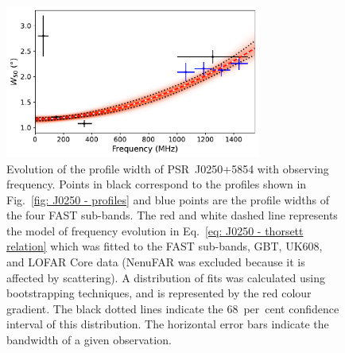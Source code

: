 \begin{figure}
    \begin{center}
        \includegraphics[width=0.75\textwidth]{Figures/J0250/thorsett_relation.pdf}
        \caption[Broadening of the profile with increasing frequency]{Evolution of the profile width of PSR~J0250+5854 with observing frequency. Points in black correspond to the profiles shown in Fig.~\ref{fig: J0250 - profiles} and blue points are the profile widths of the four FAST sub-bands. The red and white dashed line represents the model of frequency evolution in Eq.~\eqref{eq: J0250 - thorsett relation} which was fitted to the FAST sub-bands, GBT, UK608, and LOFAR Core data (NenuFAR was excluded because it is affected by scattering). A distribution of fits was calculated using bootstrapping techniques, and is represented by the red colour gradient. The black dotted lines indicate the 68~per~cent confidence interval of this distribution. The horizontal error bars indicate the bandwidth of a given observation.}
        \label{fig: J0250 - width evolution}
    \end{center}
\end{figure}

